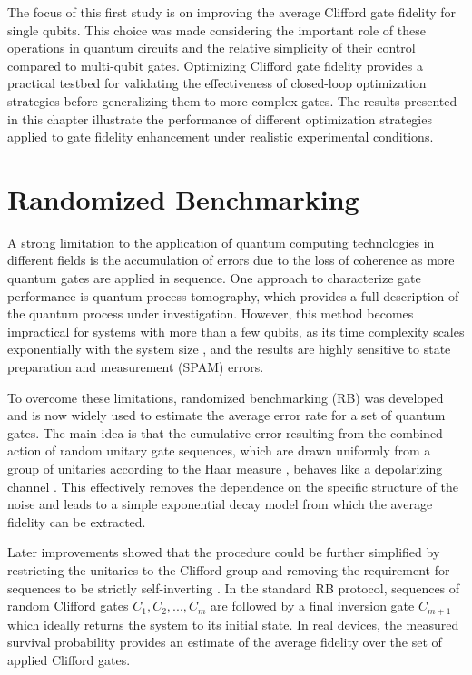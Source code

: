 The focus of this first study is on improving the average Clifford gate fidelity for single qubits. 
This choice was made considering the important role of these operations in quantum circuits and the relative simplicity of their control compared to multi-qubit gates.
Optimizing Clifford gate fidelity provides a practical testbed for validating the effectiveness of closed-loop optimization strategies before generalizing them to more complex gates.
The results presented in this chapter illustrate the performance of different optimization strategies applied to gate fidelity enhancement under realistic experimental conditions.

\section{Randomized Benchmarking}\label{sec:RBsection}
A strong limitation to the application of quantum computing technologies in different fields is the accumulation of errors due to the loss of coherence as more quantum gates are applied in sequence. 
One approach to characterize gate performance is quantum process tomography, which provides a full description of the quantum process under investigation. 
However, this method becomes impractical for systems with more than a few qubits, as its time complexity scales exponentially with the system size \cite{QPTomography}, and the results are highly sensitive to state preparation and measurement (SPAM) errors.

To overcome these limitations, randomized benchmarking (RB) was developed and is now widely used to estimate the average error rate for a set of quantum gates. 
The main idea is that the cumulative error resulting from the combined action of random unitary gate sequences, which are drawn uniformly from a group of unitaries according to the Haar measure \cite{Mele_2024}, behaves like a depolarizing channel \cite{Emerson_2005_RB}. 
This effectively removes the dependence on the specific structure of the noise and leads to a simple exponential decay model from which the average fidelity can be extracted.

Later improvements showed that the procedure could be further simplified by restricting the unitaries to the Clifford group and removing the requirement for sequences to be strictly self-inverting \cite{knill_randomized_2008}.
In the standard RB protocol, sequences of random Clifford gates $C_1, C_2, ..., C_m$ are followed by a final inversion gate $C_{m+1}$ which ideally returns the system to its initial state. 
In real devices, the measured survival probability provides an estimate of the average fidelity over the set of applied Clifford gates.

